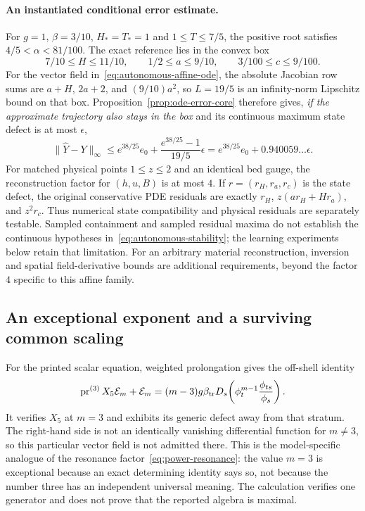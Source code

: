 \documentclass[11pt]{article}
\theoremstyle{definition}
\newcommand{\E}{\mathcal E}
\newcommand{\pr}{\operatorname{pr}}
\begin{document}
\paragraph{An instantiated conditional error estimate.}
For $g=1$, $\beta=3/10$, $H_*=T_*=1$ and $1\le T\le7/5$, the positive root satisfies
$4/5<\alpha<81/100$. The exact reference lies in the convex box
\[
 7/10\le H\le11/10,\qquad 1/2\le a\le9/10,
 \qquad 3/100\le c\le9/100.
\]
For the vector field in~\eqref{eq:autonomous-affine-ode}, the absolute
Jacobian row sums are $a+H$, $2a+2$, and $(9/10)a^2$, so $L=19/5$
is an infinity-norm Lipschitz bound on that box. Proposition~\ref{prop:ode-error-core}
therefore gives, \emph{if the approximate trajectory also stays in the box}
and its continuous maximum state defect is at most $\epsilon$,
\begin{equation}\label{eq:autonomous-stability}
 \|\widehat Y-Y\|_\infty
 \le e^{38/25}e_0+
       \frac{e^{38/25}-1}{19/5}\epsilon
 =e^{38/25}e_0+0.940059\ldots\epsilon.
\end{equation}
For matched physical points $1\le z\le2$ and an identical bed gauge,
the reconstruction factor for $(h,u,B)$ is at most $4$.
If $r=(r_H,r_a,r_c)$ is the state defect, the original conservative
PDE residuals are exactly $r_H$, $z(a r_H+H r_a)$, and $z^2r_c$.
Thus numerical state compatibility and physical residuals are separately
testable. Sampled containment and sampled residual maxima do not establish
the continuous hypotheses in~\eqref{eq:autonomous-stability}; the learning
experiments below retain that limitation. For an arbitrary material
reconstruction, inversion and spatial field-derivative bounds are additional
requirements, beyond the factor $4$ specific to this affine family.

\subsection{An exceptional exponent and a surviving common scaling}
For the printed scalar equation, weighted prolongation gives the off-shell
identity
\begin{equation}
 \pr^{(3)}X_5\E_m+\E_m
  =(m-3)g\beta_{\rm tr}D_s\!\left(
        \phi_t^{m-1}\frac{\phi_{ts}}{\phi_s}\right).
 \label{eq:sve-defect}
\end{equation}
It verifies $X_5$ at $m=3$ and exhibits its generic defect away from that
stratum. The right-hand side is not an identically vanishing differential
function for $m\ne3$, so this particular vector field is not admitted there.
This is the model-specific analogue of the resonance
factor~\eqref{eq:power-resonance}: the value $m=3$ is exceptional because an
exact determining identity says so, not because the number three has an
independent universal meaning. The calculation verifies one generator and
does not prove that the reported algebra is maximal.
\end{document}
